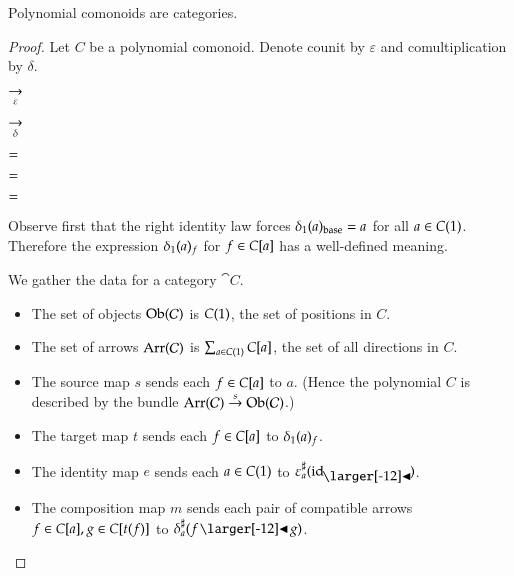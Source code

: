 \documentclass{amsart}
\begin{document}
\begin{prop}
  Polynomial comonoids are categories.
\end{prop}
\begin{proof}
  Let $C$ be a polynomial comonoid. Denote counit by $\varepsilon$
  and comultiplication by $\delta$.
  
  \begin{center}
    
    \hspace{-.75em}
    $\underset{\varepsilon}{\to}$
    
    \quad\qquad
    
    \hspace{-.75em}
    $\underset{\delta}{\to}$
    \hspace{.5em}
    
  \end{center}

  \begin{center}
    
    \quad
    $=$
    
    $=$
    \quad
    
  \end{center}

  \begin{center}
    
    \quad
    $=$
    \quad
    
  \end{center}

  Observe first that the right identity law forces ${\delta}_1(a)_{\mathrm{base}} = a$
  for all $a \in C(1)$.
  Therefore the expression ${\delta}_1(a)_f$ for $f \in C[a]$ has a
  well-defined meaning.

  We gather the data for a category $\cat{C}$.
  \begin{itemize}
  \item The set of objects $\operatorname{Ob}(\mathcal{C})$ is $C(1)$, the set
    of positions in $C$.
  \item The set of arrows $\operatorname{Arr}(\mathcal{C})$ is
    $\sum_{a \in C(1)}C[a]$, the set of all directions in $C$.
  \item The source map $s$ sends each $f \in C[a]$ to $a$. (Hence the
    polynomial $C$ is described by the bundle
    $\operatorname{Arr}(\mathcal{C}) \overset{s}{\to} \operatorname{Ob}(\mathcal{C})$.)
  \item The target map $t$ sends each $f \in C[a]$ to ${\delta}_1(a)_f$.
  \item The identity map $e$ sends each $a \in C(1)$ to
    $\dirmap{\varepsilon}{a}{\idsubd}$.
  \item The composition map $m$ sends each pair of compatible
    arrows ${f \in C[a]}, {g \in C[t(f)]}$ to $\dirmap{\delta}{a}{f \subd g}$.
  \end{itemize}


\end{proof}
\end{document}
